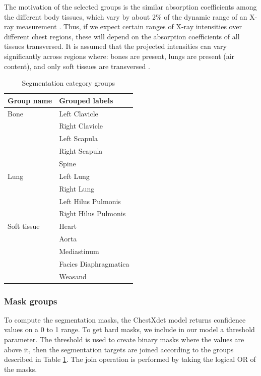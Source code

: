 \documentclass[nomenclature, english, bibtex]{kththesis}
\numberwithin{listing}{chapter}
\begin{document}
The motivation of the selected groups is the similar absorption coefficients among the different body tissues, which
vary by about 2\% of the dynamic range of an X-ray measurement  \cite[p.~54]{epstein2008}.
Thus, if we expect certain ranges of X-ray intensities over different chest regions, these will depend on the absorption coefficients of all tissues transversed.
It is assumed that the projected intensities can vary significantly across regions where: bones are present, lungs are present (air content), and only soft tissues are transversed .

\begin{table}[H]
    \centering
    \begin{tabular}{l l}
        \textbf{Group name} & \textbf{Grouped labels} \\
        \hline
        Bone &  Left Clavicle\\
            & Right Clavicle \\
            & Left Scapula\\
            &Right Scapula\\
            &Spine \\
        \hline
        Lung &  Left Lung \\
            & Right Lung \\
            & Left Hilus Pulmonis \\
            & Right Hilus Pulmonis \\
        \hline
        Soft tissue &  Heart \\
        & Aorta \\
        & Mediastinum \\
        & Facies Diaphragmatica \\
        & Weasand
    \end{tabular}
    \caption{Segmentation category groups}
    \label{tab:segmentationGroups}
\end{table}


\subsubsection{Mask groups}

To compute the segmentation masks, the ChestXdet model returns confidence values on a 0 to 1 range. To get hard masks, we include in our
model a threshold parameter. The threshold is used to create binary masks where the values are above it, then the segmentation targets
are joined according to the groups described in Table \ref{tab:segmentationGroups}. The join operation is performed by taking the logical
OR of the masks.
\end{document}
